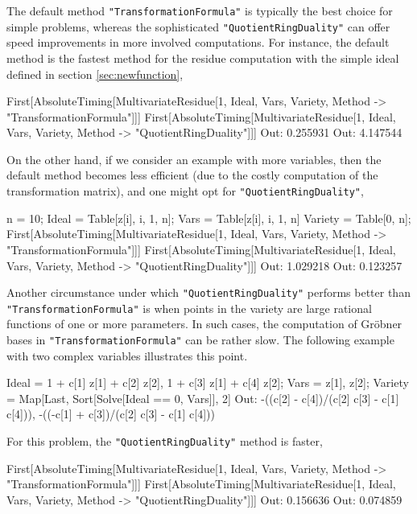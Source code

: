 \documentclass[dvipsnames,preprint,12pt,sort&compress]{elsarticle}
\newcommand{\Math}[1]
{\lstinline[style=Mathematica,breaklines=false,basicstyle=\small \ttfamily\null]~#1~}
\begin{document}
The default method \Math{"TransformationFormula"} is typically the best choice for simple problems, whereas the sophisticated \Math{"QuotientRingDuality"} can offer speed improvements in more involved computations.
For instance, the default method is the fastest method for the residue computation with the simple ideal defined in section \ref{sec:newfunction},
\begin{CodeSample}
First[AbsoluteTiming[MultivariateResidue[1, Ideal, Vars, Variety, Method -> "TransformationFormula"]]]
First[AbsoluteTiming[MultivariateResidue[1, Ideal, Vars, Variety, Method -> "QuotientRingDuality"]]]
Out: 0.255931
Out: 4.147544
\end{CodeSample}
On the other hand, if we consider an example with more variables, then the default method becomes less efficient (due to the costly computation of the transformation matrix), and one might opt for \Math{"QuotientRingDuality"},
\begin{CodeSample}
n = 10;
Ideal = Table[z[i], {i, 1, n}];
Vars = Table[z[i], {i, 1, n}]
Variety = {Table[0, {n}]};
First[AbsoluteTiming[MultivariateResidue[1, Ideal, Vars, Variety, Method -> "TransformationFormula"]]]
First[AbsoluteTiming[MultivariateResidue[1, Ideal, Vars, Variety, Method -> "QuotientRingDuality"]]]
Out: 1.029218
Out: 0.123257
\end{CodeSample}
Another circumstance under which \Math{"QuotientRingDuality"} performs better than \Math{"TransformationFormula"} is when points in the variety are large rational functions of one or more parameters. In such cases, the computation of Gr\"obner bases in \Math{"TransformationFormula"} can be rather slow. The following example with two complex variables illustrates this point.
\begin{CodeSample}
Ideal = {1 + c[1] z[1] + c[2] z[2], 1 + c[3] z[1] + c[4] z[2]};
Vars = {z[1], z[2]};
Variety = Map[Last, Sort[Solve[Ideal == 0, Vars]], {2}]
Out: {{-((c[2] - c[4])/(c[2] c[3] - c[1] c[4])),								  -((-c[1] + c[3])/(c[2] c[3] - c[1] c[4]))}}
\end{CodeSample}
For this problem, the \Math{"QuotientRingDuality"} method is faster,
\begin{CodeSample}
First[AbsoluteTiming[MultivariateResidue[1, Ideal, Vars, Variety, Method -> "TransformationFormula"]]]
First[AbsoluteTiming[MultivariateResidue[1, Ideal, Vars, Variety, Method -> "QuotientRingDuality"]]]
Out: 0.156636
Out: 0.074859
\end{CodeSample}
\end{document}
